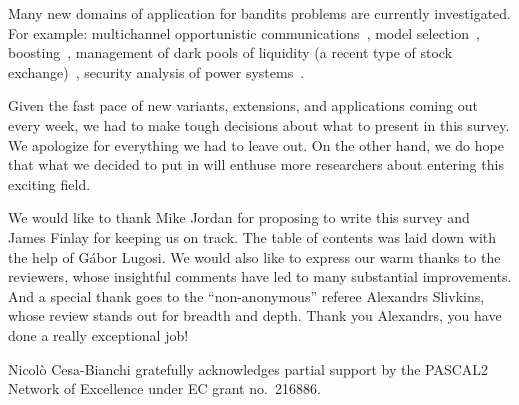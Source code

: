 \documentclass[11pt]{hackednow}
\begin{document}
Many new domains of application for bandits problems are currently investigated. For example: multichannel opportunistic communications~\cite{LZK10}, model selection~\cite{ADBL11}, boosting~\cite{BK11}, management of dark pools of liquidity (a recent type of stock exchange)~\cite{ABD10}, security analysis of power systems~\cite{BEG11}.

Given the fast pace of new variants, extensions, and applications coming out every week, we had to make tough decisions about what to present in this survey. We apologize for everything we had to leave out. On the other hand, we do hope that what we decided to put in will enthuse more researchers about entering this exciting field.
 


\begin{acknowledgements}
We would like to thank Mike Jordan for proposing to write this survey and James Finlay for keeping us on track. The table of contents was laid down with the help of G\'abor Lugosi.
We would also like to express our warm thanks to the reviewers, whose insightful comments have led to many substantial improvements. And a special thank goes to the ``non-anonymous'' referee Alexandrs Slivkins, whose review stands out for breadth and depth. Thank you Alexandrs, you have done a really exceptional job!

Nicol\`o Cesa-Bianchi gratefully acknowledges partial support by the PASCAL2 Network of Excellence under EC grant no.\ 216886.
\end{acknowledgements}



\end{document}
